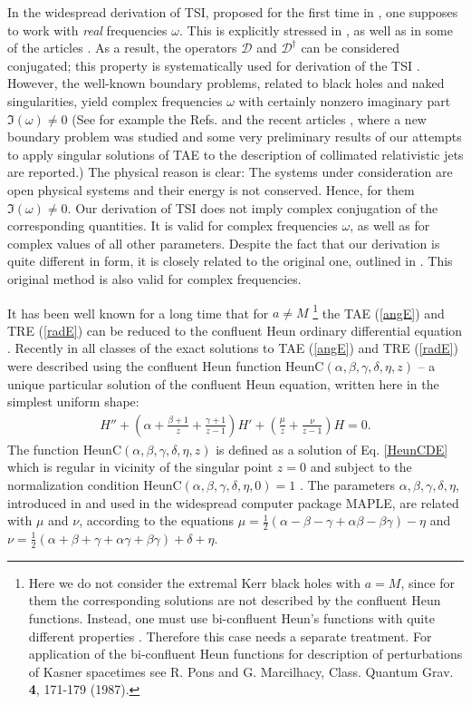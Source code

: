 \documentclass[prd,aps,twocolumn,leterpaper,preprintnumbers]{revtex4}
\numberwithin{equation}{section}
\newcommand{\ben}{\begin{eqnarray}}
\newcommand{\een}{\end{eqnarray}}
\newcommand{\la}{\label}
\begin{document}
In the widespread derivation of TSI, proposed for the first time in \cite{Chandra},
one supposes to work with {\em real} frequencies $\omega$.
This is explicitly stressed in \cite{Chandra}, as well as in some of the articles \cite{other,TSI}.
As a result, the operators $\mathcal{D}$ and $\mathcal{D}^\dag$ can be considered conjugated;
this property is systematically used for derivation of the TSI \cite{Chandra,ChandraMT,other,TSI}.
However, the  well-known boundary problems,
related to black holes and naked singularities, yield complex frequencies $\omega$
with certainly nonzero imaginary part $\Im(\omega)\neq 0$
(See for example the Refs. \cite{ChandraMT,QNM} and the recent articles \cite{PFDS},
where a new boundary problem was studied and some very preliminary
results of our attempts to apply singular solutions of TAE to the description
of collimated relativistic jets are reported.)
The physical reason is clear:
The systems under consideration are open physical systems
and their energy is not conserved. Hence, for them $\Im(\omega)\neq 0$.
Our derivation of TSI does not imply complex conjugation of the corresponding quantities.
It is valid for complex frequencies $\omega$,
as well as for complex values of all other parameters.
Despite the fact that our derivation is quite different in form,
it is closely related to the original one, outlined in \cite{Teukolsky,Starobinsky}.
This original method is also valid for complex frequencies.

It has been well known for a long time \cite{TME_Heun} that for $a\neq M$ \footnote{Here
we do not consider the extremal Kerr black holes with $a=M$,
since for them the corresponding solutions are not described by the confluent
Heun functions. Instead, one must use
bi-confluent Heun's functions with quite different properties
\cite{Heun}. Therefore this case needs a separate treatment.
For application of
the bi-confluent Heun functions for description of perturbations of Kasner spacetimes
see  R. Pons and G. Marcilhacy, Class. Quantum Grav. {\bf 4}, 171-179 (1987).}
the TAE (\ref{angE}) and TRE (\ref{radE}) can be reduced to the confluent Heun ordinary
differential equation \cite{Heun}.
Recently in \cite{Fiziev1} all classes of the exact solutions to
TAE (\ref{angE}) and  TRE (\ref{radE}) were described using
the confluent Heun function $\text{HeunC}(\alpha,\beta,\gamma,\delta,\eta,z)$
-- a unique particular solution of the confluent Heun equation,
written here in the simplest uniform shape:
%
\ben
H''\!+\!\left(\alpha\!+\!{\frac{\beta\!+\!1}{z}}\!+\!{\frac{\gamma\!+\!1}{z\!-\!1}}\right)H'\!+\!
\left({\frac\mu z}\!+\!{\frac\nu {z\!-\!1}} \right)H\!=\!0.\la{HeunCDE}
\een
%
The function $\text{HeunC}(\alpha,\beta,\gamma,\delta,\eta,z)$
is defined as a solution of Eq. \eqref{HeunCDE} which is regular in vicinity of
the singular point $z\!=\!0$ and
subject to the normalization condition $\text{HeunC}(\alpha,\beta,\gamma,\delta,\eta,0)=1$ \cite{Heun}.
%
The parameters $\alpha, \beta, \gamma, \delta, \eta $, introduced in
\cite{Heun} and used in the widespread computer package \textsc{MAPLE},
are related with $\mu$ and $\nu$, according to the equations
$\mu\!=\!{\frac{1} 2}(\alpha-\beta -\gamma+\alpha\beta-\beta\gamma)-\eta$ and
$\nu\!=\!{\frac{1} 2}(\alpha+\beta +\gamma+\alpha\gamma+\beta\gamma)+\delta + \eta$.
\end{document}
